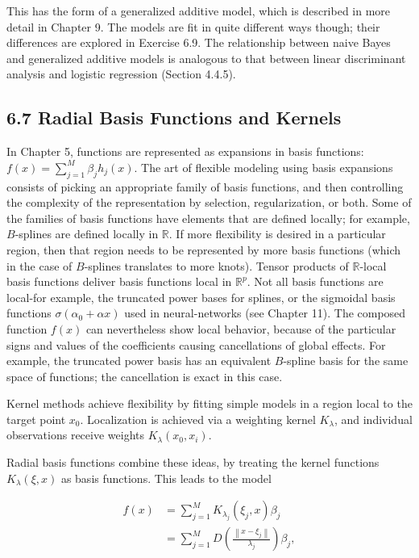 \documentclass[10pt]{article}
\begin{document}
This has the form of a generalized additive model, which is described in more detail in Chapter 9. The models are fit in quite different ways though; their differences are explored in Exercise 6.9. The relationship between naive Bayes and generalized additive models is analogous to that between linear discriminant analysis and logistic regression (Section 4.4.5).

\subsection*{6.7 Radial Basis Functions and Kernels}
In Chapter 5, functions are represented as expansions in basis functions: $f(x)=\sum_{j=1}^{M} \beta_{j} h_{j}(x)$. The art of flexible modeling using basis expansions consists of picking an appropriate family of basis functions, and then controlling the complexity of the representation by selection, regularization, or both. Some of the families of basis functions have elements that are defined locally; for example, $B$-splines are defined locally in $\mathbb{R}$. If more flexibility is desired in a particular region, then that region needs to be represented by more basis functions (which in the case of $B$-splines translates to more knots). Tensor products of $\mathbb{R}$-local basis functions deliver basis functions local in $\mathbb{R}^{p}$. Not all basis functions are local-for example, the truncated power bases for splines, or the sigmoidal basis functions $\sigma\left(\alpha_{0}+\alpha x\right)$ used in neural-networks (see Chapter 11). The composed function $f(x)$ can nevertheless show local behavior, because of the particular signs and values of the coefficients causing cancellations of global effects. For example, the truncated power basis has an equivalent $B$-spline basis for the same space of functions; the cancellation is exact in this case.

Kernel methods achieve flexibility by fitting simple models in a region local to the target point $x_{0}$. Localization is achieved via a weighting kernel $K_{\lambda}$, and individual observations receive weights $K_{\lambda}\left(x_{0}, x_{i}\right)$.

Radial basis functions combine these ideas, by treating the kernel functions $K_{\lambda}(\xi, x)$ as basis functions. This leads to the model


\begin{align*}
f(x) & =\sum_{j=1}^{M} K_{\lambda_{j}}\left(\xi_{j}, x\right) \beta_{j} \\
& =\sum_{j=1}^{M} D\left(\frac{\left\|x-\xi_{j}\right\|}{\lambda_{j}}\right) \beta_{j}, \tag{6.28}
\end{align*}
\end{document}
